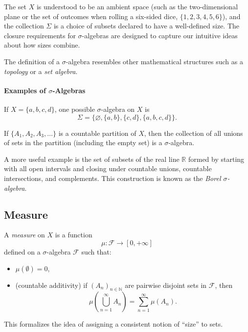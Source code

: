 \par
The set $X$ is understood to be an ambient space (such as the two-dimensional plane or the set of outcomes when rolling a six-sided dice, $\{1,2,3,4,5,6\}$), and the collection $\Sigma$ is a choice of subsets declared to have a well-defined size. The closure requirements for $\sigma$-algebras are designed to capture our intuitive ideas about how sizes combine.

\par
The definition of a $\sigma$-algebra resembles other mathematical structures such as a \textit{topology} or a \textit{set algebra}.
\paragraph{Examples of $\sigma$-Algebras}

If $X = \{ a, b, c, d \}$, one possible $\sigma$-algebra on $X$ is
\[
\Sigma = \{ \varnothing, \{a,b\}, \{c,d\}, \{a,b,c,d\} \}.
\]

\par
If $\{A_1, A_2, A_3, \ldots\}$ is a countable partition of $X$, then the collection of all unions of sets in the partition (including the empty set) is a $\sigma$-algebra.

\par
A more useful example is the set of subsets of the real line $\mathbb{R}$ formed by starting with all open intervals and closing under countable unions, countable intersections, and complements. This construction is known as the \textit{Borel $\sigma$-algebra}.
\subsection{Measure}

A \textit{measure} on $X$ is a function
\[
\mu : \mathcal{F} \to [0, +\infty]
\]
defined on a $\sigma$-algebra $\mathcal{F}$ such that:
\begin{itemize}
    \item $\mu(\emptyset) = 0$,
    \item (countable additivity) if $(A_n)_{n \in \mathbb{N}}$ are pairwise disjoint sets in $\mathcal{F}$, then
    \[
    \mu\left( \bigcup_{n=1}^{\infty} A_n \right) = \sum_{n=1}^{\infty} \mu(A_n).
    \]
\end{itemize}

\par
This formalizes the idea of assigning a consistent notion of ``size'' to sets.

